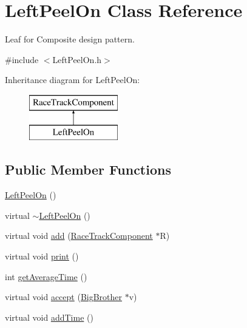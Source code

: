 \hypertarget{class_left_peel_on}{}\section{Left\+Peel\+On Class Reference}
\label{class_left_peel_on}


Leaf for Composite design pattern.  




{\ttfamily \#include $<$Left\+Peel\+On.\+h$>$}

Inheritance diagram for Left\+Peel\+On\+:\begin{figure}[H]
\begin{center}
\leavevmode
\includegraphics[height=2.000000cm]{class_left_peel_on}
\end{center}
\end{figure}
\subsection*{Public Member Functions}
\begin{DoxyCompactItemize}
\item 
\mbox{\hyperlink{class_left_peel_on_af11e174c739838ea4d2a36db409d1491}{Left\+Peel\+On}} ()
\item 
virtual \mbox{\hyperlink{class_left_peel_on_aa6d2127bbd42e360689c646b1ac7e324}{$\sim$\+Left\+Peel\+On}} ()
\item 
virtual void \mbox{\hyperlink{class_left_peel_on_a73ee71ca18d951e4938914361caa395d}{add}} (\mbox{\hyperlink{class_race_track_component}{Race\+Track\+Component}} $\ast$R)
\item 
virtual void \mbox{\hyperlink{class_left_peel_on_a929012f0508e2207ae4c8229aecece54}{print}} ()
\item 
int \mbox{\hyperlink{class_left_peel_on_adf01c9c255273eac71fc71b05e29d789}{get\+Average\+Time}} ()
\item 
virtual void \mbox{\hyperlink{class_left_peel_on_a2c35b4a139709fe6a99c055aa9ba7169}{accept}} (\mbox{\hyperlink{class_big_brother}{Big\+Brother}} $\ast$v)
\item 
virtual void \mbox{\hyperlink{class_left_peel_on_a4be64feefcd629c6dcb765175a9ea007}{add\+Time}} ()
\end{DoxyCompactItemize}
